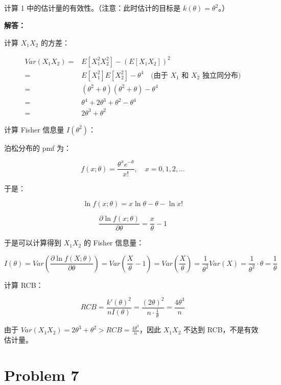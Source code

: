 \documentclass[12pt,a4paper]{article}
\begin{document}
\subsection{}

计算 1 中的估计量的有效性。（注意：此时估计的目标是 $k(\theta)=\theta^2$。）

\begin{answerbox}
\textbf{解答：}

计算 $X_1 X_2$ 的方差：

$$
\begin{aligned}
Var(X_1 X_2) =& E[X_1^2 X_2^2] - (E[X_1 X_2])^2 \\
=& E[X_1^2] E[X_2^2] - \theta^4 \quad \text{(由于 $X_1$ 和 $X_2$ 独立同分布)} \\
=& (\theta^2 + \theta)(\theta^2 + \theta) - \theta^4 \\
=& \theta^4 + 2\theta^3 + \theta^2 - \theta^4 \\
=& 2\theta^3 + \theta^2
\end{aligned}
$$

计算 Fisher 信息量 $I(\theta^2)$：

泊松分布的 pmf 为：

$$
f(x; \theta) = \frac{\theta^x e^{-\theta}}{x!}, \quad x = 0, 1, 2, \ldots
$$

于是：

$$
\ln f(x; \theta) = x \ln \theta - \theta - \ln x!
$$

$$
\frac{\partial \ln f(x; \theta)}{\partial \theta} = \frac{x}{\theta} - 1
$$

于是可以计算得到 $X_1 X_2$ 的 Fisher 信息量：

$$
I(\theta) = Var\left(\frac{\partial \ln f(X; \theta)}{\partial \theta}\right) = Var\left(\frac{X}{\theta} - 1\right) = Var\left(\frac{X}{\theta}\right) = \frac{1}{\theta^2} Var(X) = \frac{1}{\theta^2} \cdot \theta = \frac{1}{\theta}
$$

计算 RCB：

$$
RCB = \frac{k'(\theta)^2}{nI(\theta)} = \frac{(2\theta)^2}{n \cdot \frac{1}{\theta}} = \frac{4\theta^3}{n}
$$

由于 $Var(X_1 X_2) = 2\theta^3 + \theta^2 > RCB = \frac{4\theta^3}{n}$，因此 $X_1 X_2$ 不达到 RCB，不是有效估计量。

\end{answerbox}

\section{Problem 7}
\end{document}
